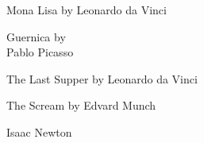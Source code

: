 \begin{figure*}[]
\centering
\footnotesize
\begin{minipage}[t]{.025\textwidth}
     \vspace{0pt}
\end{minipage}%
\hspace{1ex}%
\begin{minipage}[t]{0.98\figwidth}
    \vspace{0pt}
    \begin{minipage}[t]{0.2\textwidth}
        \centering
        Mona Lisa by Leonardo da Vinci
    \end{minipage}%
    \begin{minipage}[t]{0.2\textwidth}
        \centering
        Guernica by\\Pablo Picasso
    \end{minipage}%
    \begin{minipage}[t]{0.2\textwidth}
        \centering
        The Last Supper by Leonardo da Vinci
    \end{minipage}%
    \begin{minipage}[t]{0.2\textwidth}
        \centering
        The Scream by Edvard Munch
    \end{minipage}%
    \begin{minipage}[t]{0.2\textwidth}
        \centering
        Isaac Newton
    \end{minipage}%
\end{minipage}



\end{figure*}
